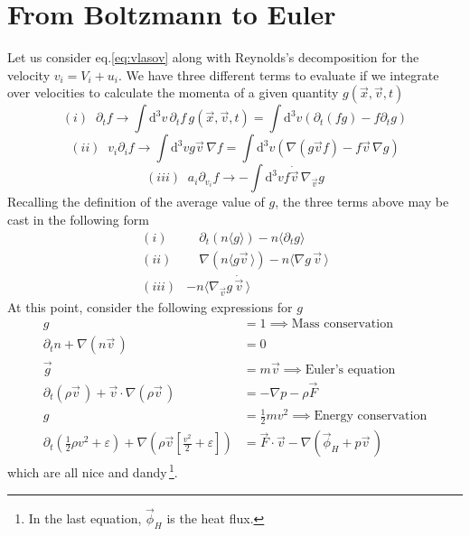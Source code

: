 \section{From Boltzmann to Euler}
Let us consider eq.\ref{eq:vlasov} along with Reynolds's decomposition for the velocity $v_{i} = V_{i}+u_{i}$. We have three different terms to evaluate if we integrate over velocities to calculate the momenta of a given quantity $g(\vec{x}, \vec{v}, t)$
\begin{equation*}
    (i)\;\; \partial_{t}f \to \int \text{d}^{3}v \,\partial_{t}f\,g(\vec{x}, \vec{v}, t) = \int \text{d}^{3}v\left(\partial_{t}(fg)-f\partial_{t}g\right)
\end{equation*}
\begin{equation*}
    (ii)\;\; v_{i}\partial_{i}f \to \int \text{d}^{3}v g\vec{v}\,\nabla f = \int \text{d}^{3}v \left(\nabla(g\vec{v}f)-f\vec{v}\,\nabla g\right)
\end{equation*}
\begin{equation*}
    (iii)\;\; a_{i}\partial_{v_{i}}f \to -\int \text{d}^{3}v f\dot{\vec{v}}\,\nabla_{\vec{v}}g
\end{equation*}
Recalling the definition of the average value of $g$, the three terms above may be cast in the following form 
\begin{align*}
    (i)& \quad \partial_{t}(n\langle g\rangle)-n\langle \partial_{t}g\rangle\\
    (ii)& \quad \nabla(n\langle g\vec{v}\,\rangle)-n\langle \nabla g\,\vec{v}\,\rangle\\ 
    (iii)& -n\langle \nabla_{\vec{v}} g\,\dot{\vec{v}}\,\rangle
\end{align*}
At this point, consider the following expressions for $g$
\begin{align}
    g &= 1 \implies \text{Mass conservation}\\
    \partial_{t}n + \nabla (n\vec{v}\,) &= 0\\
    \vec{g} &= m\vec{v} \implies \text{Euler's equation}\\
    \partial_{t}(\rho\vec{v}\,)+\vec{v}\cdot\nabla(\rho\vec{v}\,) &= -\nabla p -\rho\vec{F}\\
    g &= \frac{1}{2}mv^{2} \implies \text{Energy conservation}\\
    \partial_{t}\left(\frac{1}{2}\rho v^{2}+\varepsilon \right) +\nabla\left(\rho\vec{v}\left[\frac{v^{2}}{2}+\varepsilon\right]\right) &= \vec{F}\cdot\vec{v}-\nabla(\vec{\phi}_{H}+p\vec{v}\,)
\end{align}
which are all nice and dandy\,\footnote{In the last equation, $\vec{\phi}_{H}$ is the heat flux.}. 

